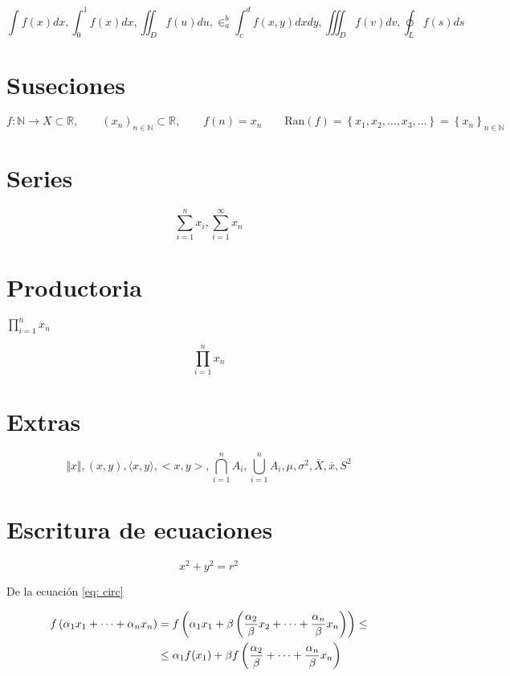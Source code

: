 \documentclass[a4paper, 11pt]{article}
\newcommand{\N}{\mathbb{N}}
\newcommand{\R}{\mathbb{R}}
\begin{document}
          $$  \int f(x)dx, \int_{0}^{1} f(x)dx, \iint_{D} f(u)du, \in_{a}^{b}\int_{c}^{d}f(x,y)dxdy, 
          \iiint_{D}f(v)dv, \oint_{L}f(s)ds $$
      
          
     \section{Suseciones}
     
        $$ f: \N \to X \subset \R, \qquad \left( x_{n} \right)_{n \in \N} \subset \R, 
        \qquad f(n) = x_{n} \qquad \text{Ran}(f) = \left\{x_{1},x_{2}, \ldots,x_{3},\ldots \right\}
        = \left\{x_{n}\right\}_{n \in \N}$$ 
      
      
     \section{Series}
      
        $$ \sum_{i=1}^{n}x_{i} , \sum_{i=1}^{\infty} x_{n} $$
      

     \section{Productoria}    
       
       $\prod_{i=1}^{n}x_{n}$
       
       $$ \prod_{i=1}^{n}x_{n} $$
         
         
     \section{Extras}
        
       $$ \Vert x \Vert, (x,y), \langle x,y \rangle, <x, y>, \bigcap_{i=1}^{n}A_{i}, \bigcup_{i=1}^{n}A_{i}, \mu, \sigma^{2}, \overline{X}, \overline{x}, S^{2} $$
    
     \section{Escritura de ecuaciones}
        
        \begin{equation}
            x^{2} + y^{2} = r^{2} \label{eq: circ}
        \end{equation}
       
        De la ecuación \eqref{eq: circ}
        
       \begin{align}
           f\left(\alpha_{1}x_{1} + \cdots + \alpha_{n}x_{n}\right) &= f\left(\alpha_{1}x_{1} +\beta \left( \frac{\alpha_{2}}{\beta}x_{2} + \cdots + \frac{\alpha_{n}}{\beta}x_{n}\right)\right) \leq  \notag\\
           & \leq \alpha_{1}f(x_{1}) + \beta f\left(\frac{\alpha_{2}}{\beta} + \cdots + \frac{\alpha_{n}}{\beta}x_{n}\right) \notag 
       \end{align}
    
\end{document}
